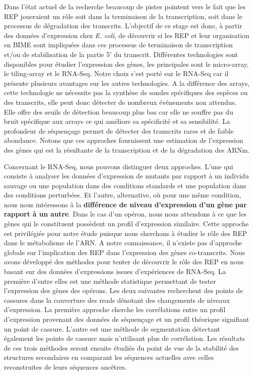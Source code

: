 \documentclass[12pt,a4paper]{report}
\begin{document}
\begin{onehalfspace}
Dans l'état actuel de la recherche beaucoup de pistes pointent vers le fait que les REP joueraient un rôle soit dans la terminaison de la transcription, soit dans le processus de dégradation des transcrits. L'objectif de ce stage est donc, à partir des données d'expression chez \textit{E. coli}, de découvrir si les REP et leur organisation en BIME sont impliquées dans ces processus de terminaison de transcription et/ou de stabilisation de la partie 5' du transcrit. Différentes technologies sont disponibles pour étudier l'expression des gènes, les principales sont le micro-array, le \gls{tiling-array} et le \gls{RNA-Seq}. Notre choix s'est porté sur le RNA-Seq car il présente plusieurs avantages sur les autres technologies. A la différence des arrays, cette technologie ne nécessite pas la synthèse de sondes spécifiques des espèces ou des transcrits, elle peut donc détecter de nombreux événements non attendus. Elle offre des seuils de détection beaucoup plus bas car elle ne souffre pas du bruit spécifique aux arrays ce qui améliore sa spécificité et sa sensibilité. La profondeur de séquençage permet de détecter des transcrits rares et de faible abondance. Notons que ces approches fournissent une estimation de l'expression des gènes qui est la résultante de la transcription et de la dégradation des ARNm.

Concernant le RNA-Seq, nous pouvons distinguer deux approches. L'une qui consiste à analyser les données d'expression de mutants par rapport à un individu sauvage ou une population dans des conditions standards et une population dans des conditions perturbées. Et l'autre, alternative, où pour une même condition, nous nous intéressons à la \textbf{différence de niveau d'expression d'un gène par rapport à un autre}. Dans le cas d'un opéron, nous nous attendons à ce que les gènes qui le constituent possèdent un profil d'expression similaire. Cette approche est privilégiée pour notre étude puisque nous cherchons à étudier le rôle des REP dans le métabolisme de l'ARN.
A notre connaissance, il n'existe pas d'approche globale sur l'implication des REP dans l'expression des gènes co-transcrits. Nous avons développé des méthodes pour tenter de découvrir le rôle des REP en nous basant sur des données d'expressions issues d'expériences de RNA-Seq. La première d'entre elles est une méthode statistique permettant de tester l'expression des gènes des opérons. Les deux suivantes recherchent des points de cassures dans la couverture des reads dénotant des changements de niveaux d'expression. La première approche cherche les corrélations entre un profil d'expression provenant des données de séquençage et un profil théorique signifiant un point de cassure. L'autre est une méthode de segmentation détectant également les points de cassure mais n'utilisant plus de corrélation. Les résultats de ces trois méthodes seront ensuite étudiés du point de vue de la stabilité des structures secondaires en comparant les séquences actuelles avec celles reconstruites de leurs séquences ancêtres.



\end{onehalfspace}
\end{document}
